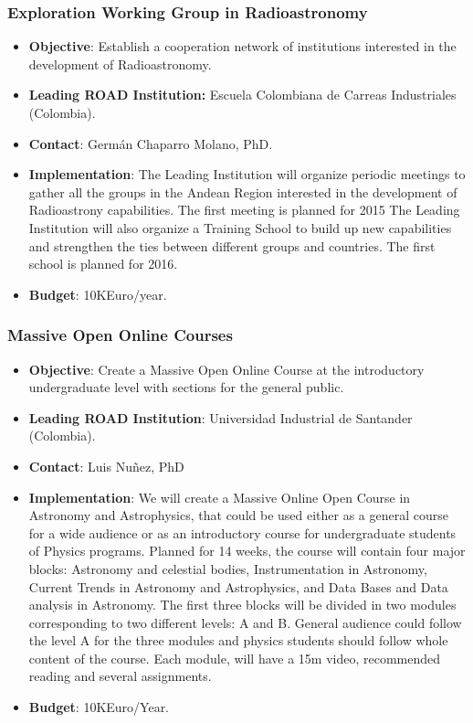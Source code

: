 \documentclass[12pt]{article}
\begin{document}
\subsubsection{Exploration Working Group in Radioastronomy}
\begin{itemize}
\item{\bf Objective}: Establish a cooperation network of institutions interested in the development of Radioastronomy.
\item{\bf Leading ROAD Institution:} Escuela Colombiana de Carreas
  Industriales (Colombia).
\item{\bf Contact}: Germ\'an Chaparro Molano, PhD.
\item{\bf Implementation}: The Leading Institution will organize
  periodic meetings to gather all the groups in the Andean Region
  interested in the development of Radioastrony capabilities. The
  first meeting is planned for 2015 
The Leading Institution will also organize a Training School to build
up new capabilities and strengthen the ties between different groups
and countries. The first school is planned for 2016.
\item{\bf Budget}: 10KEuro/year.
\end{itemize}


\subsubsection{Massive Open Online Courses}
\begin{itemize}
\item{\bf Objective}: Create a Massive Open
Online Course at the introductory undergraduate level with sections for
the general public. 
\item{\bf Leading ROAD Institution}: Universidad Industrial de
  Santander (Colombia).  
\item{\bf Contact}: Luis Nu\~nez, PhD
\item{\bf Implementation}: 
We will create a Massive Online Open
Course in Astronomy and Astrophysics, that could be used either as a
general course for a wide audience or as an introductory course for
undergraduate students of  Physics programs. Planned for 14 weeks,
the course will contain four major blocks: Astronomy and celestial
bodies, Instrumentation in Astronomy, Current Trends in Astronomy and
Astrophysics, and  Data Bases and Data analysis in Astronomy. The
first three blocks will be divided in two modules corresponding to two
different levels: A and B. General audience could follow the level A
for the three modules and physics students should follow whole content
of the course. Each module, will have a 15m video, recommended reading
and several assignments.  
\item{\bf Budget}: 10KEuro/Year.
\end{itemize}
\end{document}
